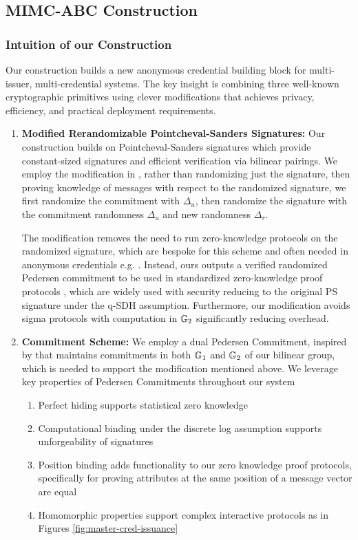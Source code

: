 \newpage
\subsection{MIMC-ABC Construction}\label{sec:mimcabc-construction}
\subsubsection{Intuition of our Construction}

Our construction builds a new anonymous credential building block for multi-issuer, multi-credential systems. The key insight is combining three well-known cryptographic primitives using clever modifications that achieves privacy, efficiency, and practical deployment requirements.

\begin{enumerate}
    \item \textbf{Modified Rerandomizable Pointcheval-Sanders Signatures:} 
    Our construction builds on Pointcheval-Sanders signatures which provide constant-sized signatures and efficient verification via bilinear pairings. We employ the modification in \cite{tomescu2022utt}, rather than randomizing just the signature, then proving knowledge of messages with respect to the randomized signature, we first randomize the commitment with $\Delta_u$, then randomize the signature with the commitment randomness $\Delta_u$ and new randomness $\Delta_r$.
    
    The modification removes the need to run zero-knowledge protocols on the randomized signature, which are bespoke for this scheme and often needed in anonymous credentials e.g. \cite{sako_short_2016, hutchison_signature_2004}. Instead, ours outputs a verified randomized Pedersen commitment to be used in standardized zero-knowledge proof protocols \cite{stephan_krenn_proposal_nodate}, which are widely used with security reducing to the original PS signature under the q-SDH assumption. Furthermore, our modification avoids sigma protocols with computation in $\mathbb{G}_2$ significantly reducing overhead. 
    
    \item \textbf{Commitment Scheme: } 
    We employ a dual Pedersen Commitment, inspired by \cite{tomescu2022utt} that maintains commitments in both $\mathbb{G}_1$ and $\mathbb{G}_2$ of our bilinear group, which is needed to support the modification mentioned above. We leverage key properties of Pedersen Commitments throughout our system
    \begin{enumerate}
        \item Perfect hiding supports statistical zero knowledge 
        \item Computational binding under the discrete log assumption supports unforgeability of signatures
        \item Position binding adds functionality to our zero knowledge proof protocols, specifically for proving attributes at the same position of a message vector are equal
        \item Homomorphic properties support complex interactive protocols as in Figures \ref{fig:master-cred-issuance}
    \end{enumerate}


\end{enumerate}
